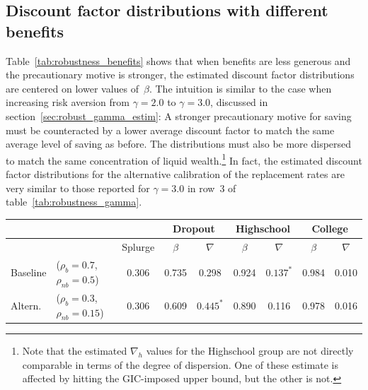 \documentclass[\latexroot/\projectname]{subfiles}
\begin{document}
\subsection*{Discount factor distributions with different benefits}
\whenintegrated{\label{sec:robust_benefits_estim}} %

Table~\ref{tab:robustness_benefits} shows that when benefits are less generous and the precautionary motive is stronger, the estimated discount factor distributions are centered on lower values of~$\beta$.
The intuition is similar to the case when increasing risk aversion from $\gamma=2.0$ to $\gamma=3.0$, discussed in section~\ref{sec:robust_gamma_estim}: A stronger precautionary motive for saving must be counteracted by a lower average discount factor to match the same average level of saving as before.
The distributions must also be more dispersed to match the same concentration of liquid wealth.\footnote{Note that the estimated $\nabla_h$ values for the Highschool group are not directly comparable in terms of the degree of dispersion.
  One of these estimate is affected by hitting the GIC-imposed upper bound, but the other is not.} In fact, the estimated discount factor distributions for the alternative calibration of the replacement rates are very similar to those reported for $\gamma=3.0$ in row~3 of table~\ref{tab:robustness_gamma}.

\begin{center}
  \small
  \begin{tabular}
    {@{}llc|cccccc@{}}
    \toprule
             &                                            &         & \multicolumn{2}{c}{Dropout} & \multicolumn{2}{c}{Highschool} & \multicolumn{2}{c}{College}                                    \\ \midrule
             &                                            & Splurge & $\beta$                     & $\nabla$                        & $\beta$                     & $\nabla$    & $\beta$ & $\nabla$ \\ \midrule
    Baseline & ($\rho_{b}\!=\!0.7$, $\rho_{nb}\!=\!0.5$)  & 0.306   & 0.735                       & 0.298                           & 0.924                       & $0.137^{*}$ & 0.984   & 0.010    \\
    Altern.  & ($\rho_{b}\!=\!0.3$, $\rho_{nb}\!=\!0.15$) & 0.306   & 0.609                       & $0.445^{*}$                     & 0.890                       & 0.116       & 0.978   & 0.016
    \\ \bottomrule
  \end{tabular}
\end{center}
\label{tab:robustness_benefits}
\end{document}
